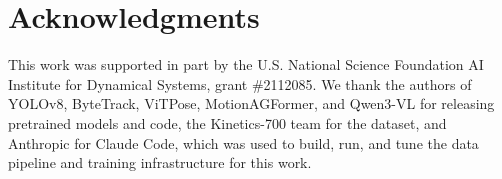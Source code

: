 \documentclass[letterpaper, 10pt, conference]{ieeeconf}
\begin{document}
\section*{Acknowledgments}

This work was supported in part by the U.S. National Science Foundation AI Institute for Dynamical Systems, grant \#2112085. We thank the authors of YOLOv8, ByteTrack, ViTPose, MotionAGFormer, and Qwen3-VL for releasing pretrained models and code, the Kinetics-700 team for the dataset, and Anthropic for Claude Code, which was used to build, run, and tune the data pipeline and training infrastructure for this work.


\end{document}
